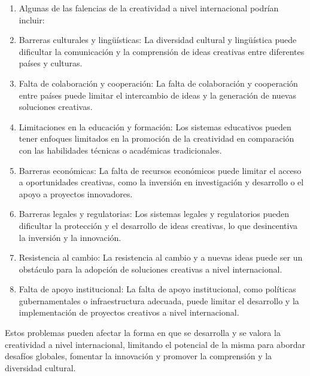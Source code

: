 \documentclass[12pt,a4paper]{article}
\begin{document}
\begin{enumerate}
\item Algunas de las falencias de la creatividad a nivel internacional podrían incluir:
\item Barreras culturales y lingüísticas: La diversidad cultural y lingüística puede dificultar la comunicación y la comprensión de ideas creativas entre diferentes países y culturas.
\item Falta de colaboración y cooperación: La falta de colaboración y cooperación entre países puede limitar el intercambio de ideas y la generación de nuevas soluciones creativas.
\item Limitaciones en la educación y formación: Los sistemas educativos pueden tener enfoques limitados en la promoción de la creatividad en comparación con las habilidades técnicas o académicas tradicionales.
\item Barreras económicas: La falta de recursos económicos puede limitar el acceso a oportunidades creativas, como la inversión en investigación y desarrollo o el apoyo a proyectos innovadores.
\item Barreras legales y regulatorias: Los sistemas legales y regulatorios pueden dificultar la protección y el desarrollo de ideas creativas, lo que desincentiva la inversión y la innovación.
\item Resistencia al cambio: La resistencia al cambio y a nuevas ideas puede ser un obstáculo para la adopción de soluciones creativas a nivel internacional.
\item Falta de apoyo institucional: La falta de apoyo institucional, como políticas gubernamentales o infraestructura adecuada, puede limitar el desarrollo y la implementación de proyectos creativos a nivel internacional.
\end{enumerate}

Estos problemas pueden afectar la forma en que se desarrolla y se valora la creatividad a nivel internacional, limitando el potencial de la misma para abordar desafíos globales, fomentar la innovación y promover la comprensión y la diversidad cultural.
\end{document}
